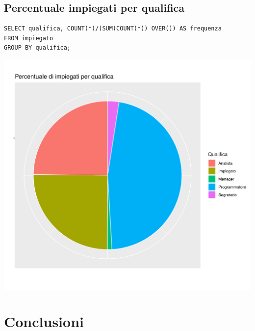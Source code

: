 \documentclass{article}
\begin{document}
\subsection{Percentuale impiegati per qualifica}
\begin{verbatim}
SELECT qualifica, COUNT(*)/(SUM(COUNT(*)) OVER()) AS frequenza 
FROM impiegato 
GROUP BY qualifica;
\end{verbatim}
\begin{center}
\includegraphics[width=\textwidth]{plot_perc_impiegati_qualifica.png}
\end{center}

\newpage

\section{Conclusioni}
\end{document}
